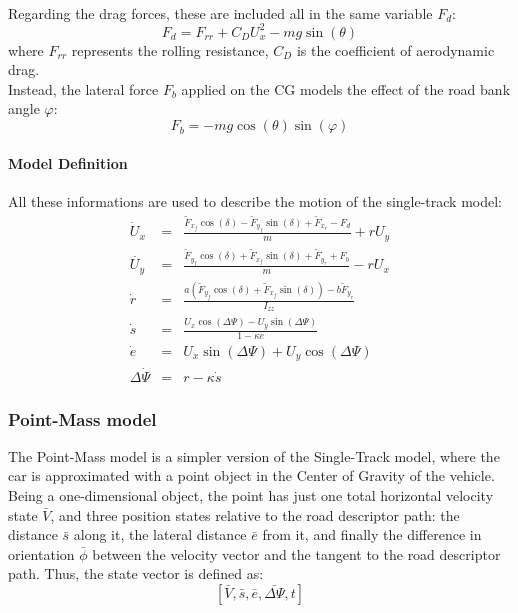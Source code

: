 \documentclass[a4paper, onecolumn, 11pt]{article}
\begin{document}
\\
Regarding the drag forces, these are included all in the same variable $F_d$:
\begin{equation}
    \label{drag_force}
    F_d = F_{rr}+C_DU_x^2-mg\sin(\theta)
\end{equation}
where $F_{rr}$ represents the rolling resistance, $C_D$ is the coefficient of aerodynamic
drag. \\
Instead, the lateral force $F_b$ applied on the CG models the effect of the road bank angle $\varphi$:
\begin{equation}
    \label{lateral_force}
    F_b = -mg\cos(\theta)\sin(\varphi)
\end{equation}
\paragraph*{Model Definition}
All these informations are used to describe the motion of the single-track model:
\begin{subequations}
    \begin{eqnarray} 
        \dot{U}_x &=& \frac{\tilde{F}_{x_f}\cos(\delta)-\tilde{F}_{y_f}\sin(\delta)+\tilde{F}_{x_r}-F_d}{m}+rU_y\\
        \dot{U_y} &=& \frac{\tilde{F}_{y_f}\cos(\delta)+\tilde{F}_{x_f}\sin(\delta)+\tilde{F}_{y_r}+F_b}{m}-rU_x\\ 
        \dot{r} &=& \frac{a(\tilde{F}_{y_f}\cos(\delta)+\tilde{F}_{x_f}\sin(\delta))-b\tilde{F}_{y_r}}{I_{zz}}\\
        \dot{s} &=& \frac{U_x\cos(\Delta \varPsi) -U_y\sin(\Delta \varPsi)}{1-\kappa e}\\
        \dot{e} &=& U_x\sin(\Delta \varPsi)+U_y \cos(\Delta \varPsi)\\
        \Delta \dot{\varPsi} &=& r-\kappa \dot{s}
    \end{eqnarray}
\end{subequations}

\subsubsection{Point-Mass model}
The Point-Mass model is a simpler version of the Single-Track model, where the
car is approximated with a point object in the Center of Gravity of the vehicle.
Being a one-dimensional object, the point has just one total horizontal velocity
state $\bar{V}$, and three position states relative to the road descriptor path:
the distance $\bar{s}$ along it, the lateral distance $\bar{e}$ from it, and
finally the difference in orientation $\bar{\phi}$ between the velocity vector
and the tangent to the road descriptor path. Thus, the state vector is defined as: 
\[[\bar V,\bar s,\bar e,\bar{\Delta\varPsi},t]\]
\end{document}

